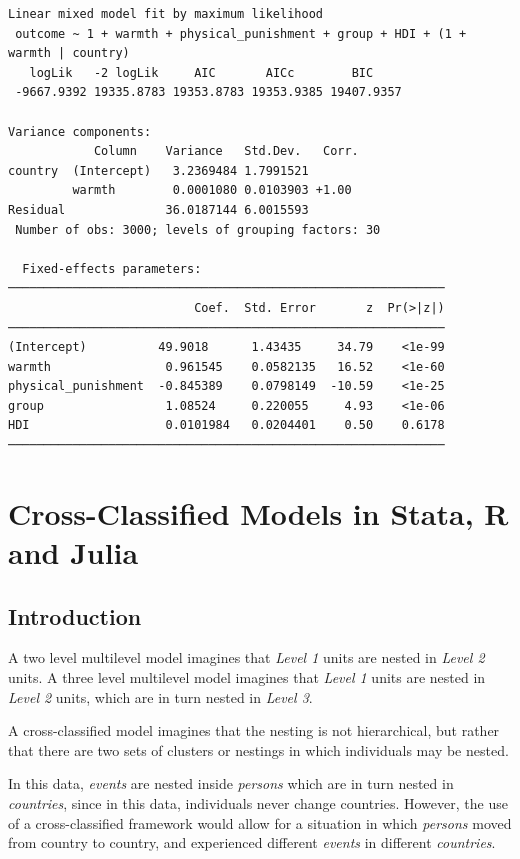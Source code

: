 \documentclass[
  letterpaper,
  DIV=11,
  numbers=noendperiod,
  oneside]{scrreprt}
\begin{document}
\begin{verbatim}
Linear mixed model fit by maximum likelihood
 outcome ~ 1 + warmth + physical_punishment + group + HDI + (1 + warmth | country)
   logLik   -2 logLik     AIC       AICc        BIC    
 -9667.9392 19335.8783 19353.8783 19353.9385 19407.9357

Variance components:
            Column    Variance   Std.Dev.   Corr.
country  (Intercept)   3.2369484 1.7991521
         warmth        0.0001080 0.0103903 +1.00
Residual              36.0187144 6.0015593
 Number of obs: 3000; levels of grouping factors: 30

  Fixed-effects parameters:
─────────────────────────────────────────────────────────────
                          Coef.  Std. Error       z  Pr(>|z|)
─────────────────────────────────────────────────────────────
(Intercept)          49.9018      1.43435     34.79    <1e-99
warmth                0.961545    0.0582135   16.52    <1e-60
physical_punishment  -0.845389    0.0798149  -10.59    <1e-25
group                 1.08524     0.220055     4.93    <1e-06
HDI                   0.0101984   0.0204401    0.50    0.6178
─────────────────────────────────────────────────────────────
\end{verbatim}


\hypertarget{cross-classified-models-in-stata-r-and-julia}{%
\chapter{Cross-Classified Models in Stata, R and
Julia}\label{cross-classified-models-in-stata-r-and-julia}}

\hypertarget{introduction-1}{%
\section{Introduction}\label{introduction-1}}

A two level multilevel model imagines that \emph{Level 1} units are
nested in \emph{Level 2} units. A three level multilevel model imagines
that \emph{Level 1} units are nested in \emph{Level 2} units, which are
in turn nested in \emph{Level 3}.

A cross-classified model imagines that the nesting is not hierarchical,
but rather that there are two sets of clusters or nestings in which
individuals may be nested.

In this data, \emph{events} are nested inside \emph{persons} which are
in turn nested in \emph{countries}, since in this data, individuals
never change countries. However, the use of a cross-classified framework
would allow for a situation in which \emph{persons} moved from country
to country, and experienced different \emph{events} in different
\emph{countries}.
\end{document}
